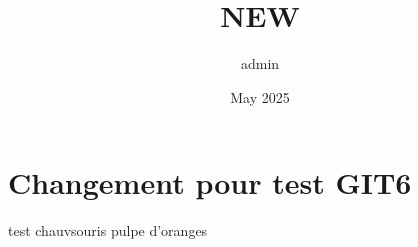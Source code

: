 \documentclass{article}
\title{NEW}
\author{admin }
\date{May 2025}
\begin{document}
\maketitle

\section{Changement pour test GIT6}
test
chauvsouris
pulpe d'oranges 
\end{document}
